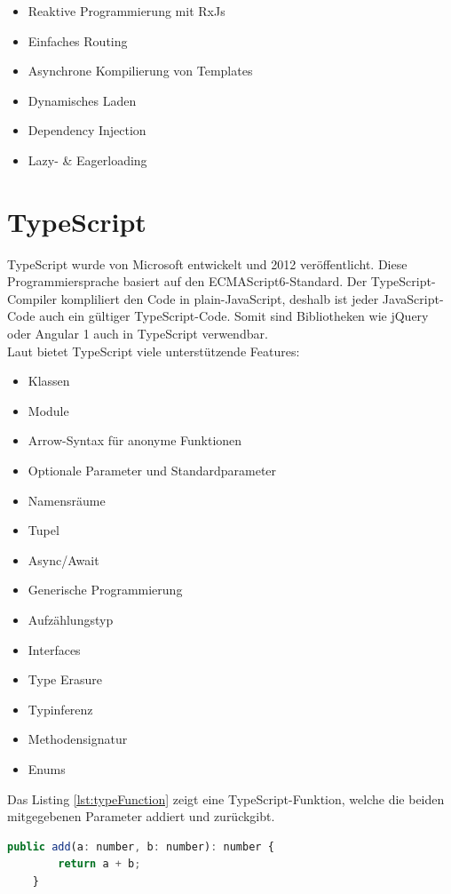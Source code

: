 \begin{itemize}
	\item Reaktive Programmierung mit RxJs
	\item Einfaches Routing
	\item Asynchrone Kompilierung von Templates
	\item Dynamisches Laden
	\item Dependency Injection
	\item Lazy- \& Eagerloading
\end{itemize}

\section{TypeScript}
TypeScript wurde von Microsoft entwickelt und 2012 veröffentlicht. Diese Programmiersprache basiert auf den ECMAScript6-Standard. Der TypeScript-Compiler kompliliert den Code in plain-JavaScript, deshalb ist jeder JavaScript-Code auch ein gültiger TypeScript-Code. Somit sind Bibliotheken wie jQuery oder Angular 1 auch in TypeScript verwendbar. \autocite{wikiTypeScript} \\
Laut \autocite{wikiTypeScript} bietet TypeScript viele unterstützende Features:
\begin{itemize}
	\item Klassen
	\item Module
	\item Arrow-Syntax für anonyme Funktionen
	\item Optionale Parameter und Standardparameter
	\item Namensräume
	\item Tupel
	\item Async/Await
	\item Generische Programmierung
	\item Aufzählungstyp
	\item Interfaces
	\item Type Erasure
	\item Typinferenz
	\item Methodensignatur
	\item Enums
\end{itemize}
Das Listing \ref{lst:typeFunction} zeigt eine TypeScript-Funktion, welche die beiden mitgegebenen Parameter addiert und zurückgibt.
\begin{lstlisting}[caption={TypeScript-Beispiel Function}, language=JavaScript, label={lst:typeFunction}]
	public add(a: number, b: number): number {
		return a + b;
	}
\end{lstlisting}
